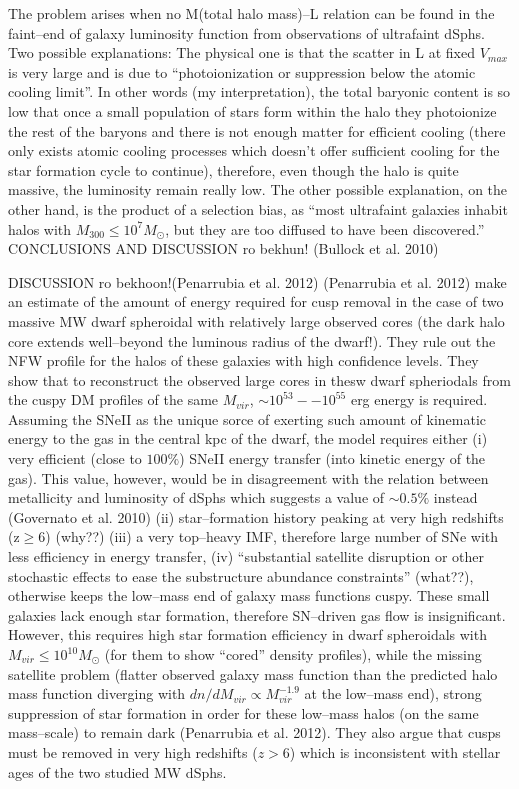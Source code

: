 \documentclass[paper=a4, fontsize=11pt]{scrartcl} %
\numberwithin{equation}{section} %
\numberwithin{figure}{section} %
\numberwithin{table}{section} %
\begin{document}
The problem arises when no M(total halo mass)--L relation can be found in the faint--end of galaxy luminosity function from observations of ultrafaint dSphs. Two possible explanations: The physical one is that the scatter in L at fixed $V_{max}$ is very large and is due to ``photoionization or suppression below the atomic cooling limit''. In other words (my interpretation), the total baryonic content is so low that once a small population of stars form within the halo they photoionize the rest of the baryons and there is not enough matter for efficient cooling (there only exists atomic cooling processes which doesn't offer sufficient cooling for the star formation cycle to continue), therefore, even though the halo is quite massive, the luminosity remain really low. The other possible explanation, on the other hand, is the product of a selection bias, as ``most ultrafaint galaxies inhabit halos with $M_{300}\leq 10^7 M_\odot$, but they are too diffused to have been discovered.'' 
CONCLUSIONS AND DISCUSSION ro bekhun! (Bullock et al. 2010)



DISCUSSION ro bekhoon!(Penarrubia et al. 2012)
({Penarrubia et al. 2012}) make an estimate of the amount of energy required for cusp removal in the case of two massive MW dwarf spheroidal with relatively large observed cores (the dark halo core extends well--beyond the luminous radius of the dwarf!). They rule out the NFW profile for the halos of these galaxies with high confidence levels. They show that to reconstruct the observed large cores in thesw dwarf spheriodals from the cuspy DM profiles of the same $M_{vir}$, $\sim 10^{53} -- 10^{55}$ erg energy is required. Assuming the SNeII as the unique sorce of exerting such amount of kinematic energy to the gas in the central kpc of the dwarf, the model requires either (i) very efficient (close to $100\%$) SNeII energy transfer (into kinetic energy of the gas). This value, however, would be in disagreement with the relation between metallicity and luminosity of dSphs which suggests a value of $\sim 0.5\%$ instead (Governato et al. 2010) (ii) star--formation history peaking at very high redshifts (z$\geq$6) (why??) (iii) a very top--heavy IMF, therefore large number of SNe with less efficiency in energy transfer, (iv) ``substantial satellite disruption or other stochastic effects to ease the substructure abundance constraints'' (what??), otherwise keeps the low--mass end of galaxy mass functions cuspy. These small galaxies lack enough star formation, therefore SN--driven gas flow is insignificant. However, this requires high star formation efficiency in dwarf spheroidals with $M_{vir} \leq 10^{10}M_\odot$ (for them to show ``cored'' density profiles), while the missing satellite problem (flatter observed galaxy mass function than the predicted halo mass function diverging with $dn/dM_{vir} \propto M_{vir}^{-1.9}$ at the low--mass end),  strong suppression of star formation in order for these low--mass halos (on the same mass--scale) to remain dark (Penarrubia et al. 2012). They also argue that cusps must be removed in very high redshifts ($z > 6$) which is inconsistent with stellar ages of the two studied MW dSphs.
\end{document}
